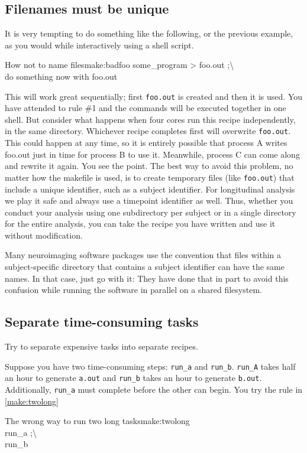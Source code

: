 \subsection{Filenames must be unique}

It is very tempting to do something like the following, or the previous example, as  you would while interactively using a shell script.
\begin{make}{How not to name files}{make:badfoo}
	some_program > foo.out ;\textbackslash \\
	do something \dd now \dd with foo.out
\end{make}

This will work great sequentially; first \texttt{foo.out} is created and then it is used. You have attended to rule \#1 and the commands will be executed together in one shell. But consider what happens when four cores run this recipe independently, in the same directory. Whichever recipe completes first will overwrite \texttt{foo.out}. This could happen at any time, so it is entirely possible that process A writes foo.out just in time for process B to use it. Meanwhile, process C can come along and rewrite it again. You see the point. The best way to avoid this problem, no matter how the makefile is used, is to create temporary files (like \texttt{foo.out}) that include a unique identifier, such as a subject identifier. For longitudinal analysis we play it safe and always use a timepoint identifier as well. Thus, whether you conduct your analysis using one subdirectory per subject or in a single directory for the entire analysis, you can take the recipe you have written and use it without modification.

Many neuroimaging software packages use the convention that files within a subject-specific directory that contains a subject identifier can have the same names. In that case, just go with it: They have done that in part to avoid this confusion while running the software in parallel on a shared filesystem.

\subsection{Separate time-consuming tasks}

Try to separate expensive tasks into separate recipes. 

Suppose you have two time-consuming steps: \texttt{run_a} and \texttt{run_b}. \texttt{run_A} takes half an hour to generate \texttt{a.out} and \texttt{run_b} takes an hour to generate \texttt{b.out}. Additionally, \texttt{run_a} must complete before the other can begin. You try the rule in \autoref{make:twolong}
\begin{make}{The wrong way to run two long tasks}{make:twolong}
	 \\
	\tab run_a ;\textbackslash \\
	\tab run_b
\end{make}

